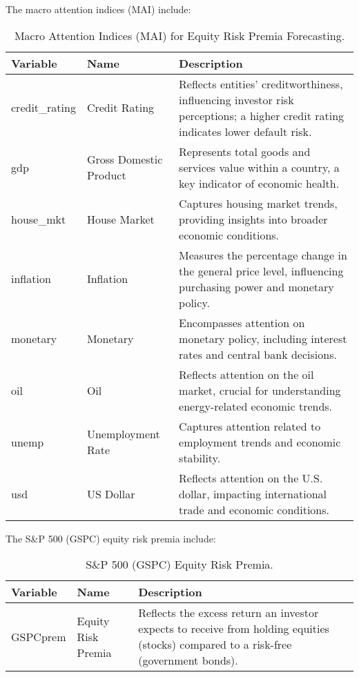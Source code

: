 \documentclass{article}
\begin{document}
The macro attention indices (MAI) include:

\begin{table}[H]
\centering
\begin{tabular}{|l|l|p{7.5cm}|}
\hline
\textbf{Variable} & \textbf{Name} & \textbf{Description} \\
\hline
credit\_rating & Credit Rating & Reflects entities' creditworthiness, influencing investor risk perceptions; a higher credit rating indicates lower default risk. \\
gdp & Gross Domestic Product & Represents total goods and services value within a country, a key indicator of economic health. \\
house\_mkt & House Market & Captures housing market trends, providing insights into broader economic conditions. \\
inflation & Inflation & Measures the percentage change in the general price level, influencing purchasing power and monetary policy. \\
monetary & Monetary & Encompasses attention on monetary policy, including interest rates and central bank decisions. \\
oil & Oil & Reflects attention on the oil market, crucial for understanding energy-related economic trends. \\
unemp & Unemployment Rate & Captures attention related to employment trends and economic stability. \\
usd & US Dollar & Reflects attention on the U.S. dollar, impacting international trade and economic conditions. \\
\hline
\end{tabular}
\caption{Macro Attention Indices (MAI) for Equity Risk Premia Forecasting.}
\label{tab:MAI}
\end{table}

The S\&P 500 (GSPC) equity risk premia include:
\begin{table}[H]
\centering
\begin{tabular}{|l|l|p{7.5cm}|}
\hline
\textbf{Variable} & \textbf{Name} & \textbf{Description} \\
\hline
GSPCprem & Equity Risk Premia  & Reflects the excess return an investor expects to receive from holding equities (stocks) compared to a risk-free (government bonds). \\
\hline
\end{tabular}
\caption{S\&P 500 (GSPC) Equity Risk Premia.}
\label{tab:GSPC}
\end{table}
\end{document}
